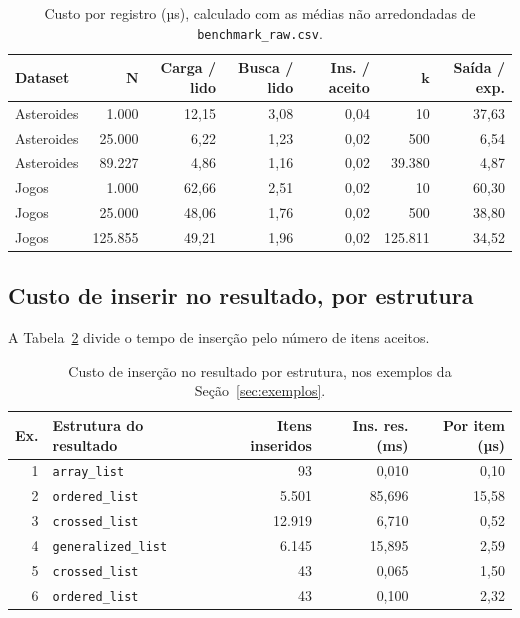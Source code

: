 \documentclass[11pt,a4paper]{article}
\newcommand{\cab}[1]{\rowcolor{gray!22}#1}
\begin{document}
\begin{table}[!htbp]
\centering
\caption{Custo por registro (µs), calculado com as médias não arredondadas de \texttt{benchmark\_raw.csv}.}
\label{tab:custo-registro}
\small
\setlength{\tabcolsep}{5pt}
\begin{tabular}{@{}l r r r r r r@{}}
\toprule
\cab{\textbf{Dataset} & $\boldsymbol{N}$ & \textbf{Carga / lido} & \textbf{Busca / lido} & \textbf{Ins. / aceito} & $\boldsymbol{k}$ & \textbf{Saída / exp.}} \\
\midrule
Asteroides & 1.000 & 12,15 & 3,08 & 0,04 & 10 & 37,63 \\
Asteroides & 25.000 & 6,22 & 1,23 & 0,02 & 500 & 6,54 \\
Asteroides & 89.227 & 4,86 & 1,16 & 0,02 & 39.380 & 4,87 \\
Jogos & 1.000 & 62,66 & 2,51 & 0,02 & 10 & 60,30 \\
Jogos & 25.000 & 48,06 & 1,76 & 0,02 & 500 & 38,80 \\
Jogos & 125.855 & 49,21 & 1,96 & 0,02 & 125.811 & 34,52 \\
\bottomrule
\end{tabular}
\end{table}

\subsection{Custo de inserir no resultado, por estrutura}

A Tabela~\ref{tab:insercao} divide o tempo de inserção pelo número de itens aceitos.

\begin{table}[!htbp]
\centering
\caption{Custo de inserção no resultado por estrutura, nos exemplos da Seção~\ref{sec:exemplos}.}
\label{tab:insercao}
\small
\begin{tabular}{@{}r l r r r@{}}
\toprule
\cab{\textbf{Ex.} & \textbf{Estrutura do resultado} & \textbf{Itens inseridos} & \textbf{Ins. res. (ms)} & \textbf{Por item (µs)}} \\
\midrule
1 & \texttt{array\_\allowbreak{}list} & 93 & 0,010 & 0,10 \\
2 & \texttt{ordered\_\allowbreak{}list} & 5.501 & 85,696 & 15,58 \\
3 & \texttt{crossed\_\allowbreak{}list} & 12.919 & 6,710 & 0,52 \\
4 & \texttt{generalized\_\allowbreak{}list} & 6.145 & 15,895 & 2,59 \\
5 & \texttt{crossed\_\allowbreak{}list} & 43 & 0,065 & 1,50 \\
6 & \texttt{ordered\_\allowbreak{}list} & 43 & 0,100 & 2,32 \\
\bottomrule
\end{tabular}
\end{table}
\end{document}
